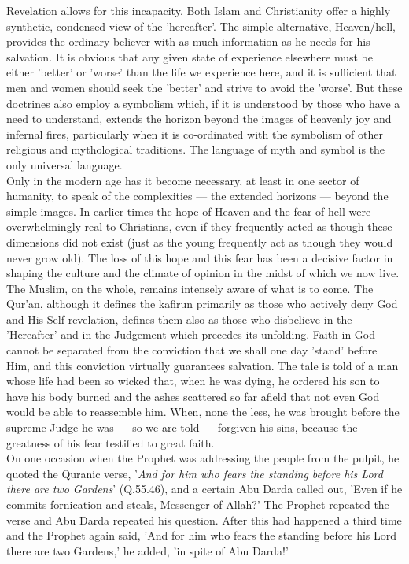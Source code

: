 \documentclass[10pt, twoside,openright]{book}
\begin{document}
Revelation allows for this incapacity. Both Islam and Christianity offer a highly synthetic, 
condensed view of the 'hereafter'. The simple alternative, Heaven/hell, provides the ordinary 
believer with as much information as he needs for his salvation. It is obvious that any given state 
of experience elsewhere must be either 'better' or 'worse' than the life we experience here, and it 
is sufficient that men and women should seek the 'better' and strive to avoid the 'worse'. But these 
doctrines also employ a symbolism which, if it is understood by those who have a need to understand, 
extends the horizon beyond the images of heavenly joy and infernal fires, particularly when it is 
co-ordinated with the symbolism of other religious and mythological traditions. The language of myth 
and symbol is the only universal language. \\

Only in the modern age has it become necessary, at least in one sector of humanity, to speak of the 
complexities --- the extended horizons --- beyond the simple images. In earlier times the hope of Heaven 
and the fear of hell were overwhelmingly real to Christians, even if they frequently acted as though 
these dimensions did not exist (just as the young frequently act as though they would never grow 
old). The loss of this hope and this fear has been a decisive factor in shaping the culture and the 
climate of opinion in the midst of which we now live. \\

The Muslim, on the whole, remains intensely aware of what is to come. The Qur'an, although it defines 
the kafirun primarily as those who actively deny God and His Self\hyp{}revelation, defines them also as 
those who disbelieve in the 'Hereafter' and in the Judgement which precedes its unfolding. Faith in 
God cannot be separated from the conviction that we shall one day 'stand' before Him, and this 
conviction virtually guarantees salvation. The tale is told of a man whose life had been so wicked 
that, when he was dying, he ordered his son to have his body burned and the ashes scattered so far 
afield that not even God would be able to reassemble him. When, none the less, he was brought before 
the supreme Judge he was --- so we are told --- forgiven his sins, because the greatness of his fear 
testified to great faith.\\ 

On one occasion when the Prophet was addressing the people from the pulpit, he quoted the Quranic 
verse, '\emph{And for him who fears the standing before his Lord there are two Gardens}' (Q.55.46), and a 
certain Abu Darda called out, 'Even if he commits fornication and steals, Messenger of Allah?' The 
Prophet repeated the verse and Abu Darda repeated his question. After this had happened a third time 
and the Prophet again said, 'And for him who fears the standing before his Lord there are two 
Gardens,' he added, 'in spite of Abu Darda!' \\
\end{document}
